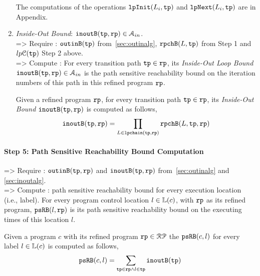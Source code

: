 \begin{enumerate}
{\begin{defn}
  \end{defn}
  }
  The computations of the operations $\mathtt{lpInit}(L_i, \mathtt{tp})$ and $\mathtt{lpNext}(L_i, \mathtt{tp})$ are in Appendix.
  \\
  \item \emph{Inside-Out Bound}: $\mathtt{inoutB}(\mathtt{tp}, \mathtt{rp}) \in \mathcal{A}_{in}$.
  \\
  => Require :
  $\mathtt{outinB}(\mathtt{tp})$ from~\ref{sec:outinalg}, $\mathtt{rpchB}(L, \mathtt{tp})$ from Step 1 and 
  $lp\mathcal{C}(\mathtt{tp})$
  Step 2 above.
  \\
  => Compute : 
  For every transition path $\mathtt{tp} \in \mathtt{rp}$, its \emph{Inside-Out Loop Bound}
   $\mathtt{inoutB}(\mathtt{tp}, \mathtt{rp}) \in \mathcal{A}_{in}$ is 
  the path sensitive reachability bound on the iteration numbers of this path in this refined program $\mathtt{rp}$. 
  \begin{defn}
    \label{def:outin_bound}
    Given a refined program $\mathtt{rp}$, for every transition path $\mathtt{tp} \in \mathtt{rp}$, 
    its \emph{Inside-Out Bound}
    $\mathtt{inoutB}(\mathtt{tp}, \mathtt{rp})$ is 
   computed as follows,
  \[
    \mathtt{inoutB}(\mathtt{tp}, \mathtt{rp}) =
    \prod\limits_{L \in \mathtt{lpchain}(\mathtt{tp}, \mathtt{rp})} \mathtt{rpchB}(L, \mathtt{tp}, \mathtt{rp})
    \]
  \end{defn}
\end{enumerate}
  \paragraph{Step 5: Path Sensitive Reachability Bound Computation}
  => Require : $\mathtt{outinB}(\mathtt{tp}, \mathtt{rp})$ and $\mathtt{inoutB}(\mathtt{tp}, \mathtt{rp})$ from~\ref{sec:outinalg} and \ref{sec:inoutalg}.
  \\
  => Compute : path sensitive reachability bound for every execution location (i.e., label).
  For every program control location $l \in \mathbb{L}(c)$, with $\mathtt{rp}$ as its refined program,
   $\mathtt{psRB}(l, \mathtt{rp})$ is its path sensitive reachability bound on the executing times of this location $l$.
   \\
   \begin{defn}
    \label{def:label_psrb}
  Given a program $c$ with its refined program $\mathtt{rp} \in \mathcal{RP}$
  the $\mathtt{psRB}(c, l)$ for every label $l \in \mathbb{L}(c)$ is computed as follows,
  \\
  \[ \mathtt{psRB}(c, l) = \sum\limits_{\mathtt{tp} \in \mathtt{rp} \land 
  l \in \mathtt{tp}} \mathtt{inoutB}(\mathtt{tp})\]
   \end{defn}